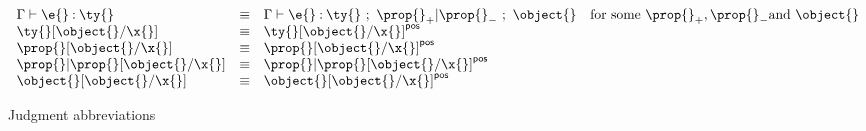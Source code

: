 \begin{figure}
$$
\begin{array}{lllr}
  \judgementtwo{\propenv{}}{\e{}}{\ty{}} &\equiv& 
  \judgement{\propenv{}}{\e{}}{\ty{}}{\filterset{\thenprop{\prop{}}}{\elseprop{\prop{}}}}{\object{}}
  & \text{for some}\ {\thenprop{\prop{}}}, {\elseprop{\prop{}}} \text{and}\ {\object{}}
%
  \\
  {\replacefor{\ty{}}{\object{}}{\x{}}} &\equiv& {\pluspolarity{\replacefor{\ty{}}{\object{}}{\x{}}}}
  \\
  {\replacefor{\prop{}}{\object{}}{\x{}}} &\equiv&  {\pluspolarity{\replacefor{\prop{}}{\object{}}{\x{}}}}
  \\
  {\replacefor{\filterset{\prop{}}{\prop{}}}{\object{}}{\x{}}} &\equiv&  {\pluspolarity{\replacefor{\filterset{\prop{}}{\prop{}}}{\object{}}{\x{}}}}
  \\
  {\replacefor{\object{}}{\object{}}{\x{}}} &\equiv& {\pluspolarity{\replacefor{\object{}}{\object{}}{\x{}}}}
%
\end{array}
$$
\caption{Judgment abbreviations}
\end{figure}
